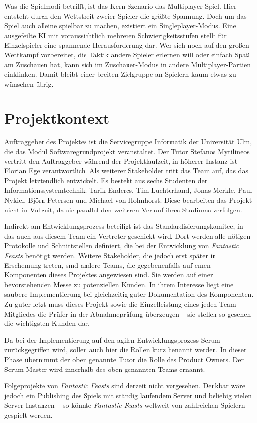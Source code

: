 Was die Spielmodi betrifft, ist das Kern-Szenario das Multiplayer-Spiel. Hier entsteht durch den Wettstreit zweier Spieler die größte Spannung. Doch um das Spiel auch alleine spielbar zu machen, existiert ein Singleplayer-Modus. Eine ausgefeilte KI mit voraussichtlich mehreren Schwierigkeitsstufen stellt für Einzelspieler eine spannende Herausforderung dar. Wer sich noch auf den großen Wettkampf vorbereitet, die Taktik andere Spieler erlernen will oder einfach Spaß am Zuschauen hat, kann sich im Zuschauer-Modus in andere Multiplayer-Partien einklinken. Damit bleibt einer breiten Zielgruppe an Spielern kaum etwas zu wünschen übrig.

\section{Projektkontext}
Auftraggeber des Projektes ist die Servicegruppe Informatik der Universität Ulm, die das Modul Softwaregrundprojekt veranstaltet. Der Tutor Stefanos Mytilineos vertritt den Auftraggeber während der Projektlaufzeit, in höherer Instanz ist Florian Ege verantwortlich. Als weiterer Stakeholder tritt das Team auf, das das Projekt letztendlich entwickelt. Es besteht aus sechs Studenten der Informationssystemtechnik: Tarik Enderes, Tim Luchterhand, Jonas Merkle, Paul Nykiel, Björn Petersen und Michael von Hohnhorst. Diese bearbeiten das Projekt nicht in Vollzeit, da sie parallel den weiteren Verlauf ihres Studiums verfolgen. 

Indirekt am Entwicklungsprozess beteiligt ist das Standardisierungskomitee, in das auch aus diesem Team ein Vertreter geschickt wird. Dort werden alle nötigen Protokolle und Schnittstellen definiert, die bei der Entwicklung von \textit{Fantastic Feasts} benötigt werden. Weitere Stakeholder, die jedoch erst später in Erscheinung treten, sind andere Teams, die gegebenenfalls auf einen Komponenten dieses Projektes angewiesen sind. Sie werden auf einer bevorstehenden Messe zu potenziellen Kunden. In ihrem Interesse liegt eine saubere Implementierung bei gleichzeitig guter Dokumentation des Komponenten. Zu guter letzt muss dieses Projekt sowie die Einzelleistung eines jeden Team-Mitgliedes die Prüfer in der Abnahmeprüfung überzeugen – sie stellen so gesehen die wichtigsten Kunden dar.

Da bei der Implementierung auf den agilen Entwicklungsprozess Scrum zurückgegriffen wird, sollen auch hier die Rollen kurz benannt werden. In dieser Phase übernimmt der oben genannte Tutor die Rolle des Product Owners. Der Scrum-Master wird innerhalb des oben genannten Teams ernannt.

Folgeprojekte von \textit{Fantastic Feasts} sind derzeit nicht vorgesehen. Denkbar wäre jedoch ein Publishing des Spiels mit ständig laufendem Server und beliebig vielen Server-Instanzen – so könnte \textit{Fantastic Feasts} weltweit von zahlreichen Spielern gespielt werden.
